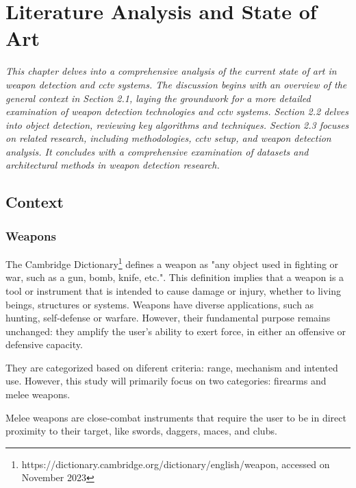 
\renewcommand{\arraystretch}{2}
\renewcommand{\figurename}{Figure}
\chapter{Literature Analysis and State of Art}
\label{chapter:literarure}

\newenvironment{literature}
{\quote\itshape}
{\endquote}

\begin{literature}
This chapter delves into a comprehensive analysis of the current state of art in weapon detection and \ac{cctv} systems. The discussion begins with an overview of the general context in Section 2.1, laying the groundwork for a more detailed examination of weapon detection technologies and \ac{cctv} systems. Section 2.2 delves into object detection, reviewing key algorithms and techniques. Section 2.3 focuses on related research, including methodologies, \ac{cctv} setup, and weapon detection analysis. It concludes with a comprehensive examination of datasets and architectural methods in weapon detection research.
\end{literature}

\section{Context}
\subsection{Weapons}
The Cambridge Dictionary\footnote{https://dictionary.cambridge.org/dictionary/english/weapon, accessed on November 2023} defines a weapon 
as "any object used in fighting or war, such as a gun, bomb, knife, etc.". This definition implies that a weapon 
is a tool or instrument  that is intended to cause damage or injury, whether to 
living beings, structures or systems. Weapons have diverse applications, such as hunting, self-defense or warfare. 
However, their fundamental purpose 
remains unchanged: they amplify the user's ability to exert force, in either an offensive or defensive capacity.

They are categorized based on diferent criteria: range, mechanism and intented use. However, 
this study will primarily focus on two categories: firearms and melee weapons.

Melee weapons are close-combat instruments that require the user to be in direct proximity to their target, 
like swords, daggers, maces, and clubs.

